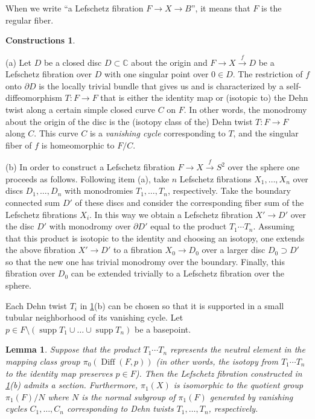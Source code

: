 \documentclass[12pt]{amsart}
\newcommand{\B}[1]{{\mathbb #1}}
\newtheorem{lemma}[subsection]{Lemma}
\theoremstyle{definition}
\newtheorem{constructions}[subsection]{Constructions} %
\theoremstyle{remark}
\numberwithin{figure}{section}
\numberwithin{table}{section}
\numberwithin{equation}{section}
\def\m{\medskip}
\newcommand\Diff{\operatorname{Diff}}
\newcommand\supp{\operatorname{supp}}
\begin{document}
\m
When we write ``a Lefschetz fibration $F\to X \to B$'', it means that 
$F$ is the regular fiber.


\begin{constructions}\label{constr}


(a) Let $D$ be a closed disc $D\subset \B C$ about the origin and $F\to X \stackrel{f}\to D$ be a Lefschetz fibration over $D$ with one singular point over $0\in D$. The restriction of $f$ onto $\partial D$ is the locally trivial bundle that gives us and is  characterized by a self-diffeomorphism  $T: F \to F$ that is either the identity map or (isotopic to) the Dehn twist along a certain simple closed curve $C$ on $F$.  In other words, the monodromy about the origin of the disc is the (isotopy class of the) Dehn twist $T: F \to F$ along $C$. This curve $C$ is a {\em vanishing cycle} corresponding to $T$, and the singular fiber of $f$ is homeomorphic to $F/C$.

\m 
(b) In order to construct a Lefschetz fibration
$F\to X\stackrel{f}\to S^2$ over the sphere
one proceeds as follows. Following item (a), take $n$ Lefschetz
fibrations $X_1, \dots ,X_n$ over discs $D_1, \ldots, D_n$ with
monodromies $T_1,\dots ,T_n$, respectively. 
Take the boundary connected sum $D'$ of these discs and consider the corresponding 
fiber sum of the Lefschetz fibrations $X_i$. In this way we  
obtain a Lefschetz fibration
$X'\to D'$ over the disc $D'$ with monodromy over $\partial D'$ equal to
the product $T_1\cdots T_n$.
Assuming that this product is isotopic to the identity and
choosing an isotopy, one extends the above fibration $X'\to D'$ 
to a fibration $X_0\to D_0$ over a larger disc $D_0\supset D'$ so that the new one 
has trivial monodromy over the boundary. Finally, 
this fibration over $D_0$ can be extended trivially to a 
Lefschetz fibration over the sphere.
\end{constructions}


\m Each Dehn twist $T_i$ in \ref{constr}(b) can be chosen so that it is supported in a small 
tubular neighborhood of its vanishing cycle. Let 
$p\in F \setminus (\supp T_1 \cup\dots\cup \supp T_n)$ be
a basepoint.

\begin{lemma}\label{L:section}
Suppose that the product $T_1\cdots T_n$ 
represents the neutral element in the mapping
class group $\pi_0(\Diff(F,p))$ {\rm(}in other words, the isotopy
from $T_1\cdots  T_n$ to the identity map preserves
$p\in F${\rm )}. Then the Lefschetz fibration constructed in {\rm \ref{constr}(b) }
admits a section. Furthermore, $\pi_1(X)$ is isomorphic 
to the quotient group $\pi_1(F)/N$ where $N$ is the normal subgroup of $\pi_1(F)$ generated by 
vanishing cycles $C_1,\ldots, C_n$ corresponding to Dehn twists $T_1, \ldots, T_n$, respectively. 
\end{lemma}
\end{document}
